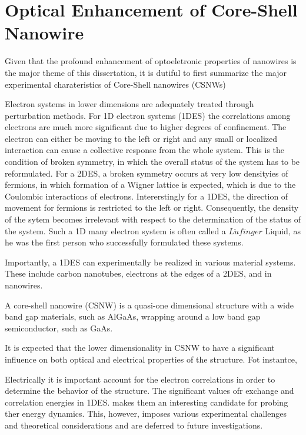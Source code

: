 \chapter{Optical Enhancement of Core-Shell Nanowire} \label{data}

Given that the profound enhancement of optoeletronic properties of nanowires is
the major theme of this dissertation, it is dutiful to first summarize the
major experimental charateristics of Core-Shell nanowires (CSNWs)

Electron systems in lower dimensions are adequately treated through
perturbation methods. For 1D electron systems (1DES) the correlations among
electrons are much more significant due to higher degrees of confinement. The
electron can either be moving to the left or right and any small or localized
interaction can cause a collective response from the whole system. This is the
condition of broken symmetry, in which the overall status of the system has to
be reformulated. For a 2DES, a broken symmetry occurs at very low densityies of
fermions, in which formation of a Wigner lattice is expected, which is due to
the Coulombic interactions of electrons. Intererstingly for a 1DES, the
direction of movement for fermions is restricted to the left or right.
Consequently, the density of the sytem becomes irrelevant with respect to the
determination of the status of the system. Such a 1D many electron system is
often called a $L\ddot{u}finger$ Liquid, as he was the first person who
successfully formulated these systems.

Importantly, a 1DES can experimentally be realized in various material systems.
These include carbon nanotubes, electrons at the edges of a 2DES, and in
nanowires.

A core-shell nanowire (CSNW) is a quasi-one dimensional structure with a wide
band gap materials, such as AlGaAs, wrapping around a low band gap
semiconductor, such as GaAs.

It is expected that the lower dimensionality in CSNW to have a significant
influence on both optical and electrical properties of the structure. Fot
instantce,

Electrically it is important account for the electron correlations in order to
determine the behavior of the structure. The significant values ofr exchange
and correlation energies in 1DES. makes them an interesting candidate for
probing ther energy dynamics. This, however, imposes various experimental
challenges and theoretical considerations and are deferred to future
investigations.

